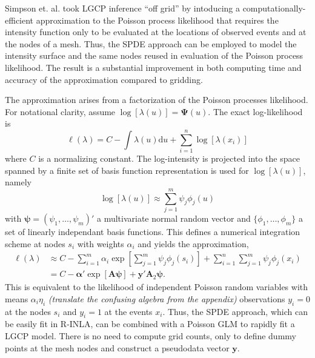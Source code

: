 \documentclass[]{interact}
\begin{document}
Simpson et. al. took LGCP inference ``off grid'' by intoducing a
computationally-efficient approximation to the Poisson process likelihood that
requires the intensity function only to be evaluated at the locations of
observed events and at the nodes of a mesh. Thus, the SPDE approach can be
employed to model the intensity surface and the same nodes reused in
evaluation of the Poisson process likelihood. The result is a substantial
improvement in both computing time and accuracy of the approximation compared
to gridding.


The approximation arises from a factorization of the Poisson processes
likelihood. For notational clarity, assume \(\log[\lambda(u)]
= \boldsymbol{\Psi}(u)\). The exact log-likelihood is
\begin{displaymath}
\ell(\lambda) = C - \int \lambda(u) \mathrm{d}u
+ \sum_{i = 1}^{n} \log\left[\lambda(x_{i})\right]
\end{displaymath}
where \(C\) is a normalizing constant. The log-intensity is projected into the
space spanned by a finite set of basis function
representation is used for \(\log[\lambda(u)]\), namely
\begin{displaymath}
\log\left[\lambda(u)\right]
\approx \sum_{j = 1}^{m} \psi_{j} \phi_{j}(u)
\end{displaymath}
with \(\boldsymbol{\psi} = (\psi_{1}, \dots, \psi_{m})'\) a multivariate
normal random vector and \(\{\phi_{1}, \dots, \phi_{m}\}\) a set of linearly
independant basis functions.
This defines a numerical integration scheme at nodes \(s_{i}\)
with weights \(\alpha_{i}\) and yields the approximation,
\begin{align*}
\ell(\lambda) &\approx C - \sum_{i = 1}^{m} \alpha_{i}
\exp\left[\sum_{j = 1}^{m} \psi_{j}\phi_{j}(s_{i})\right]
+ \sum_{i = 1}^{n} \sum_{j = 1}^{m} \psi_{j}\phi_{j}(x_{i}) \\
& = C - \boldsymbol{\alpha}'
\exp\left[\mathbf{A} \boldsymbol{\psi}\right]
+ \mathbf{y}' \mathbf{A}_{2} \boldsymbol{\psi}.
\end{align*}
This is equivalent to the likelihood of independent Poisson random variables
with means \(\alpha_{i} \eta_{i}\) {\it (translate the confusing algebra from
the appendix)} observations \(y_{i} = 0\) at the nodes \(s_{i}\) and
\(y_{i} = 1\) at the events \(x_{i}\). Thus, the SPDE approach, which can be
easily fit in R-INLA, can be combined with a Poisson GLM to rapidly fit a LGCP
model. There is no need to compute grid counts, only to define dummy points at
the mesh nodes and construct a pseudodata vector \(\mathbf{y}\).
\end{document}
